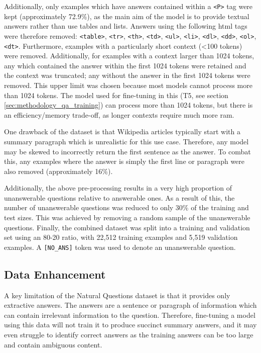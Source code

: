Additionally, only examples which have answers contained within a \texttt{<P>} tag were kept (approximately 72.9\%), as the main aim of the model is to provide textual answers rather than use tables and lists. Answers using the following \acrshort{html} tags were therefore removed: \texttt{<table>}, \texttt{<tr>}, \texttt{<th>}, \texttt{<td>}, \texttt{<ul>}, \texttt{<li>}, \texttt{<dl>}, \texttt{<dd>}, \texttt{<ol>}, \texttt{<dt>}. Furthermore, examples with a particularly short context (<100 tokens) were removed. Additionally, for examples with a context larger than 1024 tokens, any which contained the answer within the first 1024 tokens were retained and the context was truncated; any without the answer in the first 1024 tokens were removed. This upper limit was chosen because most models cannot process more than 1024 tokens. The model used for fine-tuning in this \papertype (T5, see section \ref{sec:methodology_qa_training}) can process more than 1024 tokens, but there is an efficiency/memory trade-off, as longer contexts require much more \acrshort{ram}.

One drawback of the dataset is that Wikipedia articles typically start with a summary paragraph which is unrealistic for this use case. Therefore, any model may be skewed to incorrectly return the first sentence as the answer. To combat this, any examples where the answer is simply the first line or paragraph were also removed (approximately 16\%).

Additionally, the above pre-processing results in a very high proportion of unanswerable questions relative to answerable ones. As a result of this, the number of unanswerable questions was reduced to only 30\% of the training and test sizes. This was achieved by removing a random sample of the unanswerable questions. Finally, the combined dataset was split into a training and validation set using an 80-20 ratio, with 22,512 training examples and 5,519 validation examples. A \texttt{[NO\_ANS]} token was used to denote an unanswerable question.

\subsection{Data Enhancement}\label{sec:methodology_data_enhancement}
A key limitation of the Natural Questions dataset is that it provides only extractive answers. The answers are a sentence or paragraph of information which can contain irrelevant information to the question. Therefore, fine-tuning a model using this data will not train it to produce succinct summary answers, and it may even struggle to identify correct answers as the training answers can be too large and contain ambiguous content.

